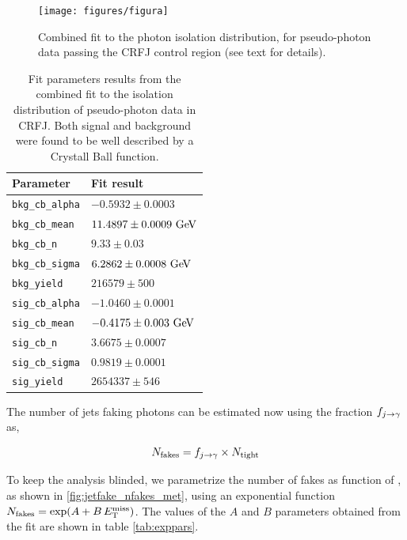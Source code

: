 \begin{figure}[h]
  \begin{center}
  \texttt{[image: figures/figura]}
  \caption{Combined fit to the photon isolation distribution, for pseudo-photon data passing the CRFJ control region (see text for details).}
  \label{fig:jetfake_combfit}
  \end{center}
\end{figure}

\begin{table}[h!]
  \centering
  \caption{Fit parameters results from the combined fit to the isolation distribution of pseudo-photon data in CRFJ. Both signal and background were found to be well described by a Crystall Ball function.}
  \begin{tabular}{l l}
     Parameter &  Fit result \\
     \hline
     \verb|bkg_cb_alpha| & $-0.5932 \pm 0.0003$ \\
     \verb|bkg_cb_mean|  & $11.4897 \pm 0.0009 \GeV$ \\
     \verb|bkg_cb_n|     & $9.33 \pm 0.03$ \\
     \verb|bkg_cb_sigma| & $6.2862 \pm 0.0008 \GeV$ \\
     \verb|bkg_yield|    & $216579 \pm 500$ \\
     \hline
     \verb|sig_cb_alpha| & $-1.0460 \pm 0.0001$ \\
     \verb|sig_cb_mean|  & $-0.4175 \pm 0.003 \GeV$ \\
     \verb|sig_cb_n|     & $3.6675 \pm 0.0007$ \\
     \verb|sig_cb_sigma| & $0.9819 \pm 0.0001$ \\
     \verb|sig_yield|    & $2654337 \pm 546$ \\
     \hline
   \end{tabular}
    \label{tab:jetfake_fit_pars}
\end{table}


The number of jets faking photons can be estimated now using the fraction $f_{j\rightarrow\gamma}$ as,

\begin{equation}\label{eq:njfakes}
  N_\text{fakes} = f_{j\rightarrow\gamma} \times N_\text{tight}
\end{equation}

To keep the analysis blinded, we parametrize the number of fakes as function of \met, as shown in {\fig} \ref{fig:jetfake_nfakes_met}, using an exponential
function $N_\text{fakes} = \exp(A+B \, E_{\mathrm{T}}^{\mathrm{miss}})$. The values of the $A$ and $B$ parameters obtained from the fit are shown in table \ref{tab:exppars}.

